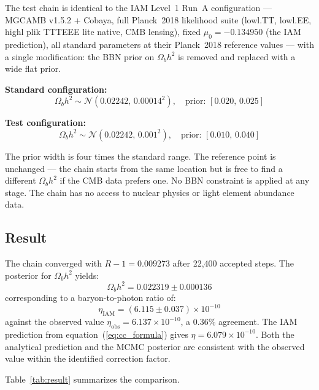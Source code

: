 \documentclass[12pt,a4paper]{article}
\begin{document}
The test chain is identical to the IAM Level~1 Run~A configuration
\citep{mahaffey2026} — MGCAMB v1.5.2 + Cobaya, full Planck~2018
likelihood suite (lowl.TT, lowl.EE, highl plik TTTEEE lite native,
CMB lensing), fixed $\mu_0 = -0.134950$ (the IAM prediction), all
standard parameters at their Planck~2018 reference values — with a
single modification: the BBN prior on $\Omega_b h^2$ is removed
and replaced with a wide flat prior.

\textbf{Standard configuration:}
\begin{equation*}
\Omega_b h^2 \sim \mathcal{N}(0.02242,\, 0.00014^2),
\quad \text{prior: } [0.020,\, 0.025]
\end{equation*}

\textbf{Test configuration:}
\begin{equation*}
\Omega_b h^2 \sim \mathcal{N}(0.02242,\, 0.001^2),
\quad \text{prior: } [0.010,\, 0.040]
\end{equation*}

The prior width is four times the standard range. The reference
point is unchanged — the chain starts from the same location but
is free to find a different $\Omega_b h^2$ if the CMB data prefers
one. No BBN constraint is applied at any stage. The chain has no
access to nuclear physics or light element abundance data.

\subsection{Result}

The chain converged with $R - 1 = 0.009273$ after 22{,}400
accepted steps. The posterior for $\Omega_b h^2$ yields:
\begin{equation}
\Omega_b h^2 = 0.022319 \pm 0.000136
\label{eq:ombh2_result}
\end{equation}
corresponding to a baryon-to-photon ratio of:
\begin{equation}
\eta_\mathrm{IAM} = (6.115 \pm 0.037) \times 10^{-10}
\label{eq:eta_result}
\end{equation}
against the observed value $\eta_\mathrm{obs} = 6.137 \times
10^{-10}$, a $0.36\%$ agreement. The IAM prediction from
equation~(\ref{eq:cc_formula}) gives $\eta = 6.079 \times
10^{-10}$. Both the analytical prediction and the MCMC posterior
are consistent with the observed value within the identified
correction factor.

Table~\ref{tab:result} summarizes the comparison.
\end{document}
